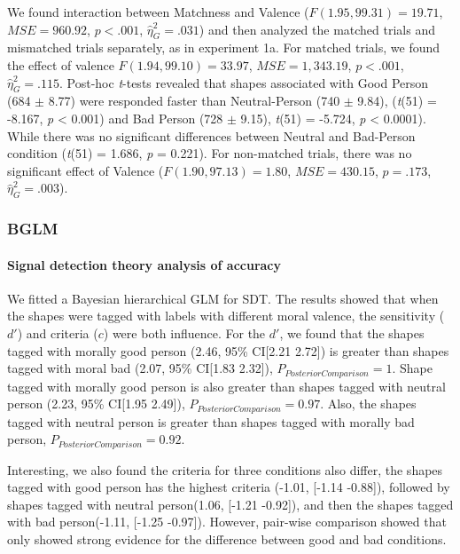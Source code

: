 \documentclass[
  english,
  man]{apa6}
\let\oldparagraph\paragraph
\renewcommand{\paragraph}[1]{\oldparagraph{#1}\mbox{}}
\begin{document}
We found interaction between Matchness and Valence (\(F(1.95, 99.31) = 19.71\), \(\mathit{MSE} = 960.92\), \(p < .001\), \(\hat{\eta}^2_G = .031\)) and then analyzed the matched trials and mismatched trials separately, as in experiment 1a. For matched trials, we found the effect of valence \(F(1.94, 99.10) = 33.97\), \(\mathit{MSE} = 1,343.19\), \(p < .001\), \(\hat{\eta}^2_G = .115\). Post-hoc \emph{t}-tests revealed that shapes associated with Good Person (684 \(\pm\) 8.77) were responded faster than Neutral-Person (740 \(\pm\) 9.84), (\emph{t}(51) = -8.167, \emph{p} \textless{} 0.001) and Bad Person (728 \(\pm\) 9.15), \emph{t}(51) = -5.724, \emph{p} \textless{} 0.0001). While there was no significant differences between Neutral and Bad-Person condition (\emph{t}(51) = 1.686, \emph{p} = 0.221). For non-matched trials, there was no significant effect of Valence (\(F(1.90, 97.13) = 1.80\), \(\mathit{MSE} = 430.15\), \(p = .173\), \(\hat{\eta}^2_G = .003\)).

\hypertarget{bglm}{%
\subsubsection{BGLM}\label{bglm}}

\hypertarget{signal-detection-theory-analysis-of-accuracy}{%
\paragraph{Signal detection theory analysis of accuracy}\label{signal-detection-theory-analysis-of-accuracy}}

We fitted a Bayesian hierarchical GLM for SDT. The results showed that when the shapes were tagged with labels with different moral valence, the sensitivity (\(d'\)) and criteria (\(c\)) were both influence. For the \(d'\), we found that the shapes tagged with morally good person (2.46, 95\% CI{[}2.21 2.72{]}) is greater than shapes tagged with moral bad (2.07, 95\% CI{[}1.83 2.32{]}), \(P_{PosteriorComparison} = 1\). Shape tagged with morally good person is also greater than shapes tagged with neutral person (2.23, 95\% CI{[}1.95 2.49{]}), \(P_{PosteriorComparison} = 0.97\). Also, the shapes tagged with neutral person is greater than shapes tagged with morally bad person, \(P_{PosteriorComparison} = 0.92\).

Interesting, we also found the criteria for three conditions also differ, the shapes tagged with good person has the highest criteria (-1.01, {[}-1.14 -0.88{]}), followed by shapes tagged with neutral person(1.06, {[}-1.21 -0.92{]}), and then the shapes tagged with bad person(-1.11, {[}-1.25 -0.97{]}). However, pair-wise comparison showed that only showed strong evidence for the difference between good and bad conditions.
\end{document}
